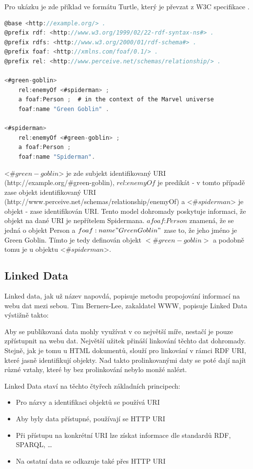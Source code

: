 \documentclass[thesis=B,czech]{FITthesis}[2012/06/26]
\begin{document}
 Pro ukázku je zde příklad ve formátu Turtle, který je převzat z W3C specifikace \cite{turtle_example}.
 \begin{lstlisting}[language=C, basicstyle=\small]
@base <http://example.org/> .
@prefix rdf: <http://www.w3.org/1999/02/22-rdf-syntax-ns#> .
@prefix rdfs: <http://www.w3.org/2000/01/rdf-schema#> .
@prefix foaf: <http://xmlns.com/foaf/0.1/> .
@prefix rel: <http://www.perceive.net/schemas/relationship/> .

<#green-goblin>
    rel:enemyOf <#spiderman> ;
    a foaf:Person ;  # in the context of the Marvel universe
    foaf:name "Green Goblin" .

<#spiderman>
    rel:enemyOf <#green-goblin> ;
    a foaf:Person ;
    foaf:name "Spiderman".
\end{lstlisting}
<$\#green-goblin$> je zde subjekt identifikovaný URI (http://example.org/\#green-goblin),
$rel$:$enemyOf$ je predikát - v tomto případě zase objekt identifikovaný URI (http://www.perceive.net/schemas/relationship/enemyOf) a 
 <$\#spiderman$> je objekt - zase identifikován URI.
 Tento model dohromady poskytuje informaci, že objekt na dané URI je nepřítelem Spidermana. $a foaf$:$Person$ znamená, že
 se jedná o objekt Person a $foaf:name "Green Goblin"$ zase to, že jeho jméno je Green Goblin. Tímto je tedy definován objekt $<\#green-goblin>$ a podobně tomu je u 
 objektu <$\#spiderman$>.
 
 \subsection{Linked Data}
  Linked data, jak už název napovdá, popisuje metodu propojování informací na webu dat mezi sebou.  
  Tim Berners-Lee, zakaldatel WWW,  popisuje Linked Data výstižně takto: 
   \cite{TimBL_LD}
  
  Aby se publikovaná data mohly využívat v co největší míře, nestačí je pouze zpřístupnit na webu dat. Největší užitek přináší linkování těchto dat dohromady.
  Stejně, jak je tomu u HTML dokumentů, slouží pro linkování v rámci RDF URI, které jasně identifikují objekty. Nad takto prolinkovanými daty se poté dají
  najít různé vztahy, které by bez prolinkování nebylo monžé nalézt.
  
  Linked Data staví na těchto čtyřech základních principech:
  \begin{itemize}
   \item Pro názvy a identifikaci objektů se používá URI
   \item Aby byly data přístupné, používají se HTTP URI
   \item Při přístupu na konkrétní URI lze získat informace dle standardů RDF, SPARQL, \ldots
   \item Na ostatní data se odkazuje také přes HTTP URI
  \end{itemize}
  
\end{document}
